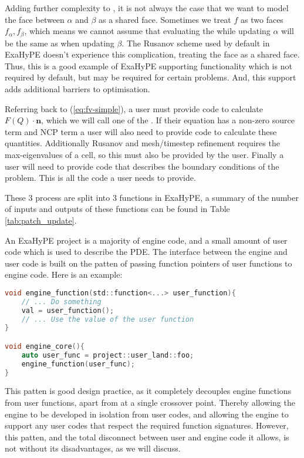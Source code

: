 Adding further complexity to , it is not always the case that we want to model the face between $\alpha$ and $\beta$ as a shared face.
Sometimes we treat $f$ as two faces $f_\alpha, f_\beta$, which means we cannot assume that evaluating the  while updating $\alpha$ will be the same as when updating $\beta$.
The Rusanov scheme used by default in ExaHyPE doesn't experience this complication, treating the face as a shared face. 
Thus, this is a good example of ExaHyPE supporting functionality which is not required by default, but may be required for certain problems.
And, this support adds additional barriers to optimisation.

Referring back to (\ref{eq:fv-simple}), a user must provide code to calculate $F(Q)\cdot\mathbf{n}$, which we will call one of the .
If their equation has a non-zero source term and NCP term a user will also need to provide code to calculate these quantities.
Additionally Rusanov and mesh/timestep refinement requires the max-eigenvalues of a cell, so this must also be provided by the user.
Finally a user will need to provide code that describes the boundary conditions of the problem.
This is all the code a user needs to provide.

These 3 process are split into 3 functions in ExaHyPE, a summary of the number of inputs and outputs of these functions can be found in Table \ref{tab:patch_update}.




An ExaHyPE project is a majority of engine code, and a small amount of user code which is used to describe the PDE.
The interface between the engine and user code is built on the patten of passing function pointers of user functions to engine code.
Here is an example:
\begin{lstlisting}[language=c]
void engine_function(std::function<...> user_function){
    // ... Do something
    val = user_function();
    // ... Use the value of the user function 
}

void engine_core(){
    auto user_func = project::user_land::foo;
    engine_function(user_func);
}
\end{lstlisting}

This patten is good design practice, as it completely decouples engine functions from user functions, apart from at a single crossover point.
Thereby allowing the engine to be developed in isolation from user codes, and allowing the engine to support any user codes that respect the required function signatures.
However, this patten, and the total disconnect between user and engine code it allows, is not without its disadvantages, as we will discuss.

